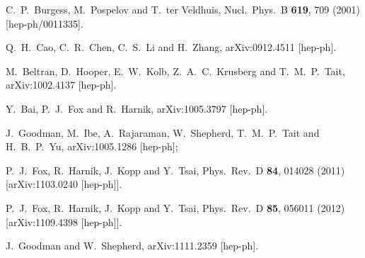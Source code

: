 \begin{thebibliography}{90}
  

  C.~P.~Burgess, M.~Pospelov and T.~ter Veldhuis,
  Nucl.\ Phys.\ B {\bf 619}, 709 (2001)
  [hep-ph/0011335].
  



  Q.~H.~Cao, C.~R.~Chen, C.~S.~Li and H.~Zhang,
  arXiv:0912.4511 [hep-ph].

  M.~Beltran, D.~Hooper, E.~W.~Kolb, Z.~A.~C.~Krusberg and T.~M.~P.~Tait,
  arXiv:1002.4137 [hep-ph].

  Y.~Bai, P.~J.~Fox and R.~Harnik,
  arXiv:1005.3797 [hep-ph].

  J.~Goodman, M.~Ibe, A.~Rajaraman, W.~Shepherd, T.~M.~P.~Tait and H.~B.~P.~Yu,
  arXiv:1005.1286 [hep-ph];

  P.~J.~Fox, R.~Harnik, J.~Kopp and Y.~Tsai,
  Phys.\ Rev.\ D {\bf 84}, 014028 (2011)
  [arXiv:1103.0240 [hep-ph]].

  P.~J.~Fox, R.~Harnik, J.~Kopp and Y.~Tsai,
  Phys.\ Rev.\ D {\bf 85}, 056011 (2012)
  [arXiv:1109.4398 [hep-ph]].

  J.~Goodman and W.~Shepherd,
  arXiv:1111.2359 [hep-ph].



\end{thebibliography}
